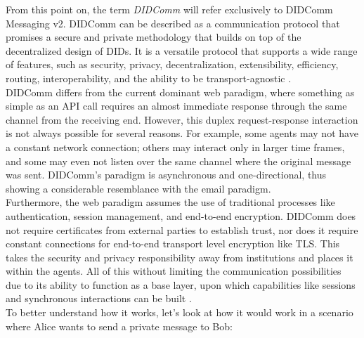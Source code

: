 From this point on, the term \emph{DIDComm} will refer exclusively to DIDComm Messaging v2. DIDComm can be described as a communication protocol that promises a secure and private methodology that builds on top of the decentralized design of DIDs. It is a versatile protocol that supports a wide range of features, such as security, privacy, decentralization, extensibility, efficiency, routing, interoperability, and the ability to be transport-agnostic \cite{curren_looker_terbu_2020}.\\
DIDComm differs from the current dominant web paradigm, where something as simple as an API call requires an almost immediate response through the same channel from the receiving end. However, this duplex request-response interaction is not always possible for several reasons. For example, some agents may not have a constant network connection; others may interact only in larger time frames, and some may even not listen over the same channel where the original message was sent. DIDComm's paradigm is asynchronous and one-directional, thus showing a considerable resemblance with the email paradigm. \\
Furthermore, the web paradigm assumes the use of traditional processes like authentication, session management, and end-to-end encryption. DIDComm does not require certificates from external parties to establish trust, nor does it require constant connections for end-to-end transport level encryption like TLS. This takes the security and privacy responsibility away from institutions and places it within the agents. All of this without limiting the communication possibilities due to its ability to function as a base layer, upon which capabilities like sessions and synchronous interactions can be built \cite{curren_looker_terbu_2020}.\\ 
To better understand how it works, let's look at how it would work in a scenario where Alice wants to send a private message to Bob: 

